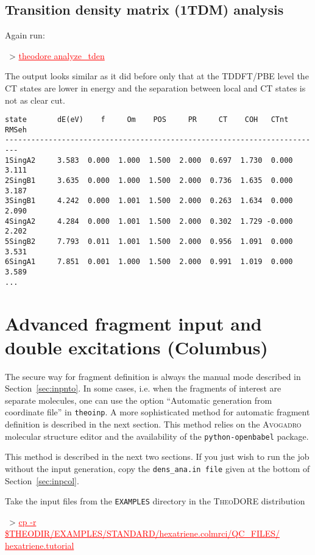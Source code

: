 \documentclass[DIV=12,headings=normal]{scrartcl}
\newcommand{\redl}[1]{{\textcolor{red}{\underline{#1}}}}
\newcommand{\comm}[1]{
\small
~> \redl{#1}
\normalsize
}
\newcommand{\theo}{\textsc{TheoDORE}}
\begin{document}
\subsection{Transition density matrix (1TDM) analysis}
Again run:

\comm{theodore analyze\_tden}

The output looks similar as it did before only that at the TDDFT/PBE level the CT states are lower in energy and the separation between local and CT states is not as clear cut.

\scriptsize
\begin{Verbatim}[commandchars=\\\{\}]
state       dE(eV)    f     Om    POS     PR     CT    COH   CTnt  RMSeh
-------------------------------------------------------------------------
1SingA2     3.583  0.000  1.000  1.500  2.000  0.697  1.730  0.000  3.111
2SingB1     3.635  0.000  1.000  1.500  2.000  0.736  1.635  0.000  3.187
3SingB1     4.242  0.000  1.001  1.500  2.000  0.263  1.634  0.000  2.090
4SingA2     4.284  0.000  1.001  1.500  2.000  0.302  1.729 -0.000  2.202
5SingB2     7.793  0.011  1.001  1.500  2.000  0.956  1.091  0.000  3.531
6SingA1     7.851  0.001  1.000  1.500  2.000  0.991  1.019  0.000  3.589
...
\end{Verbatim}
\normalsize


\section{Advanced fragment input and double excitations (Columbus)}
\label{sec:advinp}

The secure way for fragment definition is always the manual mode described in Section~\ref{sec:inpnto}.
In some cases, i.e. when the fragments of interest are separate molecules, one can use the option ``Automatic generation from coordinate file'' in \texttt{theoinp}.
A more sophisticated method for automatic fragment definition is described in the next section.
This method relies on the \textsc{Avogadro} molecular structure editor and the availability of the \texttt{python-openbabel} package.

This method is described in the next two sections.
If you just wish to run the job without the input generation, copy the \texttt{dens\_ana.in file} given at the bottom of Section~\ref{sec:inpcol}.

Take the input files from the \texttt{EXAMPLES} directory in the \theo{} distribution

\comm{cp -r \$THEODIR/EXAMPLES/STANDARD/hexatriene.colmrci/QC\_FILES/ hexatriene.tutorial} \\
\end{document}
